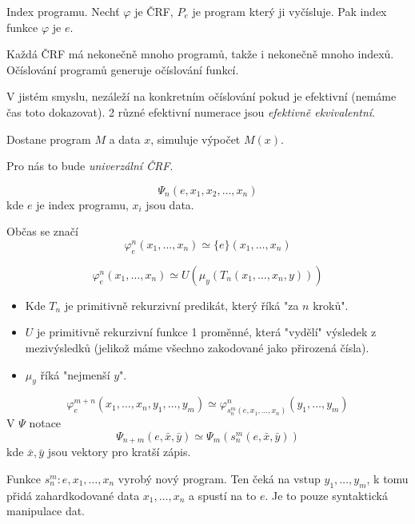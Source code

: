 \begin{definition}
	Index programu.
	Nechť $\varphi$ je ČRF, $P_e$ je program který ji vyčísluje.
	Pak index funkce $\varphi$ je $e$.
\end{definition}

\begin{note}
	Každá ČRF má nekonečně mnoho programů, takže i nekonečně mnoho indexů.
	Očíslování programů generuje očíslování funkcí.

	V jistém smyslu, nezáleží na konkretním očíslování pokud je efektivní (nemáme čas toto dokazovat).
	2 různé efektivní numerace jsou \emph{efektivně ekvivalentní}.
\end{note}


\begin{reminder}[Univerzální TS]
	Dostane program $M$ a data $x$, simuluje výpočet $M(x)$.

	Pro nás to bude \emph{univerzální ČRF}.
\end{reminder}

\begin{definition}
	\[ \Psi_n(e, x_1, x_2, \ldots, x_n) \]
	kde $e$ je index programu, $x_i$ jsou data.

	Občas se značí
	\[ \varphi_e^n(x_1, \ldots, x_n) \simeq \{e\}(x_1, \ldots, x_n) \]
\end{definition}

\begin{notation}
	\[ \varphi_e^n(x_1, \ldots, x_n) \simeq U(\mu_y(T_n(x_1, \ldots, x_n, y))) \]

	\begin{itemize}
		\item Kde $T_n$ je primitivně rekurzivní predikát, který říká "za $n$ kroků".
		\item $U$ je primitivně rekurzivní funkce 1 proměnné, která "vydělí" výsledek z mezivýsledků (jelikož máme všechno zakodované jako přirozená čísla).
		\item $\mu_y$ říká "nejmenší $y$".
	\end{itemize}
\end{notation}

\begin{theorem}[s-m-n (BD)]\label{s_m_n}
	\[ \varphi_e^{m + n}(x_1, \ldots, x_n, y_1, \ldots, y_m) \simeq \varphi_{s_n^m(e, x_1, \ldots, x_n)}^n(y_1, \ldots, y_m) \]
	V $\Psi$ notace
	\[ \Psi_{n + m}(e, \bar{x}, \bar{y}) \simeq \Psi_m(s_n^m(e, \bar{x}, \bar{y})) \]
	kde $\bar{x}, \bar{y}$ jsou vektory pro kratší zápis.

	Funkce $s_n^m: e, x_1, \ldots, x_n$ vyrobý nový program.
	Ten čeká na vstup $y_1, \ldots, y_m$, k tomu přidá zahardkodované data $x_1, \ldots, x_n$ a spustí na to $e$.
	Je to pouze syntaktická manipulace dat.
\end{theorem}

